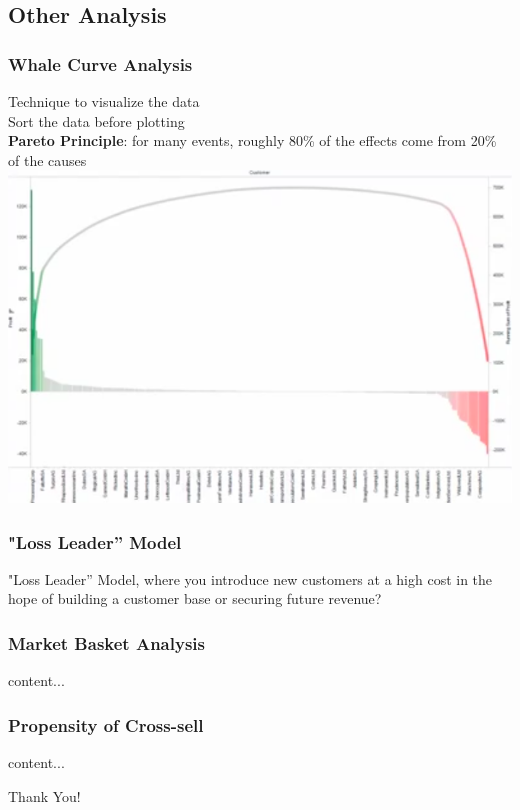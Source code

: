 \documentclass{beamer}
\begin{document}
\subsection{Other Analysis}
\begin{frame}\frametitle{Whale Curve Analysis}
Technique to visualize the data\\
Sort the data before plotting\\
\textbf{Pareto Principle}: for many events, roughly 80\% of the effects come from 20\% of the causes\\
\includegraphics[scale=0.3]{other/whalecurve}

\end{frame}

\begin{frame}\frametitle{"Loss Leader” Model}

"Loss Leader” Model, where you introduce new customers at a high cost in the hope of building a customer base or securing future revenue? 

\end{frame}

\begin{frame}\frametitle{Market Basket Analysis}
content...
\end{frame}

\begin{frame}\frametitle{Propensity of Cross-sell}
content...
\end{frame}




\begin{frame}
\Huge{\centerline{Thank You!}}
\end{frame}

\end{document}
